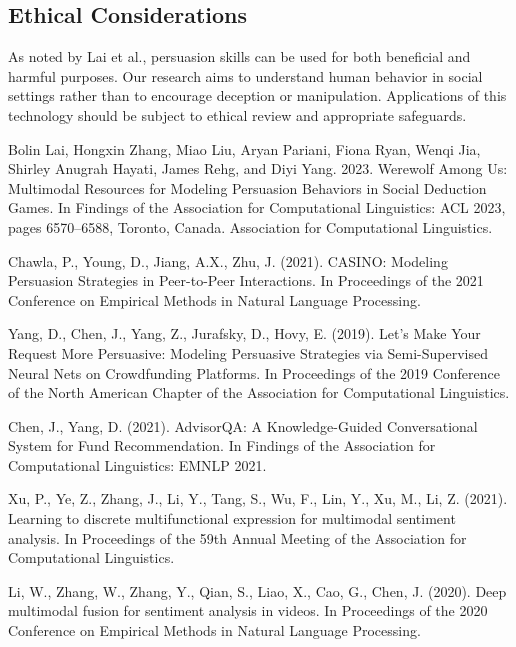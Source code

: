 \documentclass{article}
\begin{document}
\subsection{Ethical Considerations}
As noted by Lai et al., persuasion skills can be used for both beneficial and harmful purposes. Our research aims to understand human behavior in social settings rather than to encourage deception or manipulation. Applications of this technology should be subject to ethical review and appropriate safeguards.



\begin{thebibliography}{10}

Bolin Lai, Hongxin Zhang, Miao Liu, Aryan Pariani, Fiona Ryan, Wenqi Jia, Shirley Anugrah Hayati, James Rehg, and Diyi Yang. 2023. Werewolf Among Us: Multimodal Resources for Modeling Persuasion Behaviors in Social Deduction Games. In Findings of the Association for Computational Linguistics: ACL 2023, pages 6570–6588, Toronto, Canada. Association for Computational Linguistics.

Chawla, P., Young, D., Jiang, A.X., Zhu, J. (2021). CASINO: Modeling Persuasion Strategies in Peer-to-Peer Interactions. In Proceedings of the 2021 Conference on Empirical Methods in Natural Language Processing.

Yang, D., Chen, J., Yang, Z., Jurafsky, D., Hovy, E. (2019). Let's Make Your Request More Persuasive: Modeling Persuasive Strategies via Semi-Supervised Neural Nets on Crowdfunding Platforms. In Proceedings of the 2019 Conference of the North American Chapter of the Association for Computational Linguistics.

Chen, J., Yang, D. (2021). AdvisorQA: A Knowledge-Guided Conversational System for Fund Recommendation. In Findings of the Association for Computational Linguistics: EMNLP 2021.

Xu, P., Ye, Z., Zhang, J., Li, Y., Tang, S., Wu, F., Lin, Y., Xu, M., Li, Z. (2021). Learning to discrete multifunctional expression for multimodal sentiment analysis. In Proceedings of the 59th Annual Meeting of the Association for Computational Linguistics.

Li, W., Zhang, W., Zhang, Y., Qian, S., Liao, X., Cao, G., Chen, J. (2020). Deep multimodal fusion for sentiment analysis in videos. In Proceedings of the 2020 Conference on Empirical Methods in Natural Language Processing.


\end{thebibliography}
\end{document}
